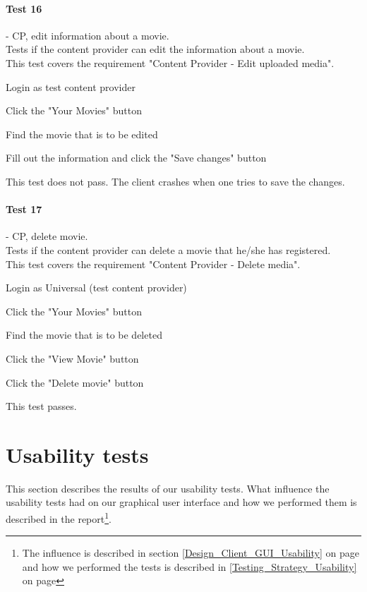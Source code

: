 \paragraph{Test 16} - CP, edit information about a movie. \\
Tests if the content provider can edit the information about a movie. \\
This test covers the requirement "Content Provider - Edit uploaded media".
\begin{my_enumerate}
\item Login as test content provider
\item Click the "Your Movies" button
\item Find the movie that is to be edited
\item Fill out the information and click the "Save changes" button
\end{my_enumerate}
This test does not pass. The client crashes when one tries to save the changes.

\paragraph{Test 17} - CP, delete movie. \\
Tests if the content provider can delete a movie that he/she has registered. \\
This test covers the requirement "Content Provider - Delete media".
\begin{my_enumerate}
\item Login as Universal (test content provider)
\item Click the "Your Movies" button
\item Find the movie that is to be deleted
\item Click the "View Movie" button
\item Click the "Delete movie" button
\end{my_enumerate}
This test passes.

\section{Usability tests}
\label{Appendix_Test_Usability}
This section describes the results of our usability tests. What influence the usability tests had on our graphical user interface and how we performed them is described in the report\footnote{The influence is described in section \ref {Design_Client_GUI_Usability} on page \pageref{Design_Client_GUI_Usability} and how we performed the tests is described in \ref{Testing_Strategy_Usability} on page \pageref{Testing_Strategy_Usability}}.

